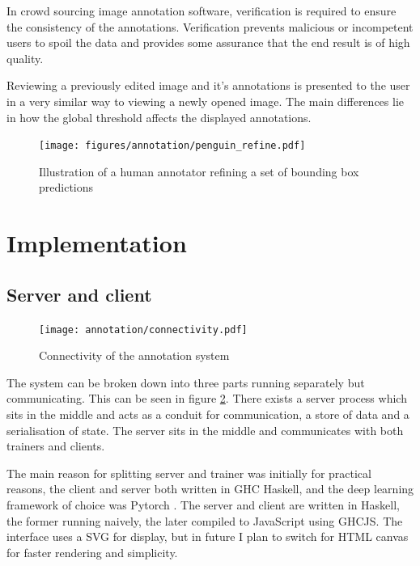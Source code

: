 In crowd sourcing image annotation software, verification is required to ensure the consistency of the annotations. Verification prevents malicious or incompetent users to spoil the data and provides some assurance that the end result is of high quality. 

Reviewing a previously edited image and it's annotations is presented to the user in a very similar way to viewing a newly opened image. The main differences lie in how the global threshold affects the displayed annotations. 


\begin{figure}[h!]
  \centering
  \texttt{[image: figures/annotation/penguin\_refine.pdf]}
  \caption{Illustration of a human annotator refining a set of bounding box predictions }   
  \label{fig:penguin_refinement}
\end{figure}








\section {Implementation}

\subsection{Server and client}

\begin{figure}[h!]
  \centering
  \texttt{[image: annotation/connectivity.pdf]}
  \caption{Connectivity of the annotation system}  
  \label{fig:connectivity}
\end{figure}

The system can be broken down into three parts running separately but communicating. This can be seen in figure \ref{fig:connectivity}. There exists a server process which sits in the middle and acts as a conduit for communication, a store of data and a serialisation of state. The server sits in the middle and communicates with both trainers and clients.

The main reason for splitting server and trainer was initially for practical reasons, the client and server both written in \gls{GHC} Haskell, and the deep learning framework of choice was Pytorch \cite{Paszke2017}. The server and client are written in Haskell, the former running naively, the later compiled to JavaScript using \gls{GHCJS}. The interface uses a \gls{SVG} for display, but in future I plan to switch for \gls{HTML} canvas for faster rendering and simplicity.

